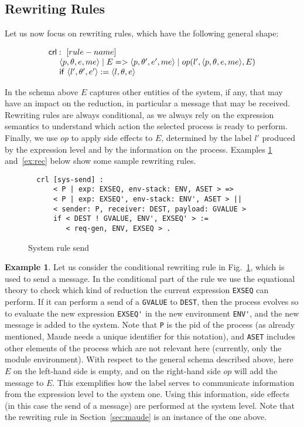 \documentclass{article}[12pt,a4paper]
\theoremstyle{definition}
\newtheorem{example}{Example}[section]
\newcommand{\paral}{\;|\;}
\begin{document}
\subsection{Rewriting Rules}
Let us now focus on rewriting rules, which have the following general shape:

\[
  \begin{array}{l}
    \ms{crl}:~[rule-name]\\
    ~~~~\langle p, \theta, e, me \rangle \paral E => \langle p,\theta', e', me \rangle \paral op(l', \langle p, \theta, e, me \rangle, E)\\
    ~~~~\ms{if}~\langle l', \theta', e'\rangle := \langle l,\theta,e\rangle
  \end{array}
\]

In the schema above $E$ captures other entities of the system, if any,
that may have an impact on the reduction, in particular a message that
may be received.  Rewriting rules are always conditional, as we always
rely on the expression semantics to understand which action the
selected process is ready to perform. Finally, we use $op$ to apply
side effects to $E$, determined by the label $l'$ produced by the
expression level and by the information on the process. Examples \ref{ex:send} and~\ref{ex:rec} below show
some sample rewriting rules.

\begin{figure}[t]
  \centering
\begin{verbatim}
  crl [sys-send] :
      < P | exp: EXSEQ, env-stack: ENV, ASET > =>
      < P | exp: EXSEQ', env-stack: ENV', ASET > ||
      < sender: P, receiver: DEST, payload: GVALUE >
      if < DEST ! GVALUE, ENV', EXSEQ' > :=
         < req-gen, ENV, EXSEQ > .
\end{verbatim}
  \caption{System rule send}
  \label{fig:rule-send}
\end{figure}

\begin{example}\label{ex:send}
  Let us consider the conditional rewriting rule in Fig.~\ref{fig:rule-send}, which is used to send a message. In the conditional part of the
  rule we use the equational theory to check which kind of reduction the current expression \verb+EXSEQ+ can perform. If it can perform a send of a \verb+GVALUE+ to \verb+DEST+, then the process evolves so to evaluate the new expression \verb+EXSEQ'+ in the new environment \verb+ENV'+, and the new message is added to the system. Note that \verb+P+ is the pid of the process (as already mentioned, Maude needs a unique identifier for this notation), and \verb+ASET+ includes other elements of the process which are not relevant here (currently, only the module environment).
  With respect to the general schema described above, here $E$ on the left-hand side is empty, and
  on the right-hand side $op$ will add the message to $E$.
  This exemplifies how the label serves to communicate information from the
  expression level to the system one. Using this information, side effects (in this case the send of a message) are performed at the system level. Note that the rewriting rule in Section~\ref{sec:maude} is an instance of the one above.
\end{example}
\end{document}

